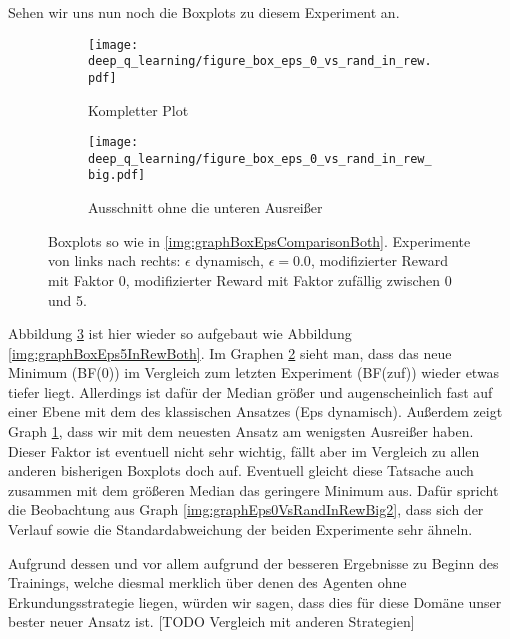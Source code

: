 Sehen wir uns nun noch die Boxplots zu diesem Experiment an.
\begin{figure}[h!]
    \centering
    \begin{subfigure}[b]{0.7\textwidth}
        \texttt{[image: deep\_q\_learning/figure\_box\_eps\_0\_vs\_rand\_in\_rew.pdf]}
        \caption{Kompletter Plot}
        \label{img:graphBoxEps0VsRandInRew}
    \end{subfigure}
    \begin{subfigure}[b]{0.7\textwidth}
        \texttt{[image: deep\_q\_learning/figure\_box\_eps\_0\_vs\_rand\_in\_rew\_big.pdf]}
        \caption{Ausschnitt ohne die unteren Ausreißer}
        \label{img:graphBoxEps0VsRandInRewBig}
    \end{subfigure}
    \caption{Boxplots so wie in \ref{img:graphBoxEpsComparisonBoth}. Experimente von links nach rechts: $ \epsilon $ dynamisch, $ \epsilon = 0.0 $, modifizierter Reward mit Faktor 0, modifizierter Reward mit Faktor zufällig zwischen 0 und 5.}
    \label{img:graphBoxEps0VsRandInRewBoth}
\end{figure}
Abbildung \ref{img:graphBoxEps0VsRandInRewBoth} ist hier wieder so aufgebaut wie Abbildung \ref{img:graphBoxEps5InRewBoth}. Im Graphen \ref{img:graphBoxEps0VsRandInRewBig} sieht man, dass das neue Minimum (BF(0)) im Vergleich zum letzten Experiment (BF(zuf)) wieder etwas tiefer liegt. Allerdings ist dafür der Median größer und augenscheinlich fast auf einer Ebene mit dem des klassischen Ansatzes (Eps dynamisch). Außerdem zeigt Graph \ref{img:graphBoxEps0VsRandInRew}, dass wir mit dem neuesten Ansatz am wenigsten Ausreißer haben. Dieser Faktor ist eventuell nicht sehr wichtig, fällt aber im Vergleich zu allen anderen bisherigen Boxplots doch auf. Eventuell gleicht diese Tatsache auch zusammen mit dem größeren Median das geringere Minimum aus. Dafür spricht die Beobachtung aus Graph \ref{img:graphEps0VsRandInRewBig2}, dass sich der Verlauf sowie die Standardabweichung der beiden Experimente sehr ähneln.

Aufgrund dessen und vor allem aufgrund der besseren Ergebnisse zu Beginn des Trainings, welche diesmal merklich über denen des Agenten ohne Erkundungsstrategie liegen, würden wir sagen, dass dies für diese Domäne unser bester neuer Ansatz ist. [TODO Vergleich mit anderen Strategien]